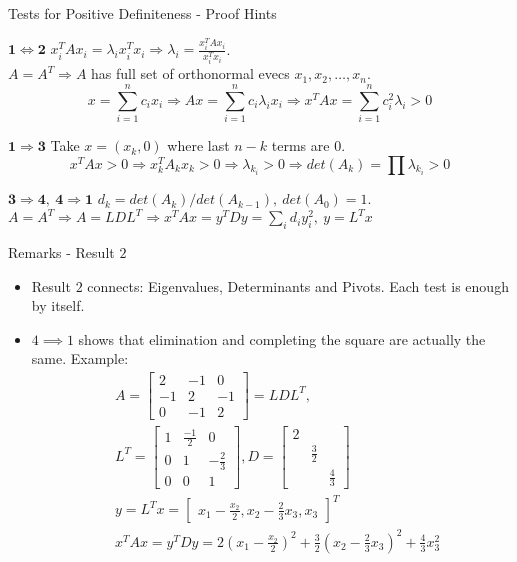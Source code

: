 \documentclass{beamer}
\begin{document}
\begin{frame}{Tests for Positive Definiteness - Proof Hints}{}
\begin{block}{$\mathbf{1 \iff  2}$}
$x_i^TAx_i = \lambda_i x_i^Tx_i \Rightarrow \lambda_i = \frac{x_i^TAx_i}{x_i^Tx_i}$.\\
 $A = A^T \Rightarrow A$ has full set of orthonormal evecs $x_1, x_2, \ldots, x_n$. 
\begin{equation*}
    x = \sum_{i=1}^{n}c_ix_i \Rightarrow Ax = \sum_{i=1}^{n}c_i\lambda_ix_i \Rightarrow x^TAx = \sum_{i=1}^{n}c_i^2\lambda_i>0
\end{equation*}
\end{block}
\begin{block}{$\mathbf{1 \Rightarrow  3}$}
Take $x = (x_k,0)$ where last $n-k$ terms are $0$. 
\begin{equation*}
x^TAx > 0 \Rightarrow x_k^TA_kx_k > 0 \Rightarrow \lambda_{k_i} > 0 \Rightarrow det(A_k) = \prod\lambda_{k_i} > 0
\end{equation*}
\end{block}
\begin{block}{$\mathbf{3 \Rightarrow  4}, \ \mathbf{4 \Rightarrow  1}$}
$d_k = det(A_k)/det(A_{k-1}), \ det(A_0) = 1$.\\
$A = A^T \Rightarrow A = LDL^T \Rightarrow x^TAx = y^TDy = \sum_{i}d_iy_i^2,\ y = L^Tx$
\end{block}
\end{frame}

\begin{frame}{Remarks - Result $2$}{}
\begin{itemize}
    \item Result $2$ connects: Eigenvalues, Determinants and Pivots. Each test is enough by itself.
    \item {$4 \implies 1$ shows that elimination and completing the square are actually the same. Example:
        \begin{align*}
            &A = \begin{bmatrix}2&-1&0\\-1&2&-1\\0&-1&2\end{bmatrix} = LDL^T, \\ &L^T=\begin{bmatrix}1&\frac{-1}{2}&0\\0&1&-\frac{2}{3}\\0&0&1\end{bmatrix}, D = \begin{bmatrix}2&&\\&\frac{3}{2}&\\&&\frac{4}{3}\end{bmatrix}\\
            &y=L^Tx = \begin{bmatrix}x_1-\frac{x_2}{2}, x_2-\frac{2}{3}x_3, x_3\end{bmatrix}^T\\
            &x^TAx = y^TDy = 2\left(x_1-\frac{x_2}{2}\right)^2 + \frac{3}{2}\left(x_2-\frac{2}{3}x_3\right)^2 + \frac{4}{3}x_3^2
        \end{align*}
    }
\end{itemize}
\end{frame}
\end{document}
